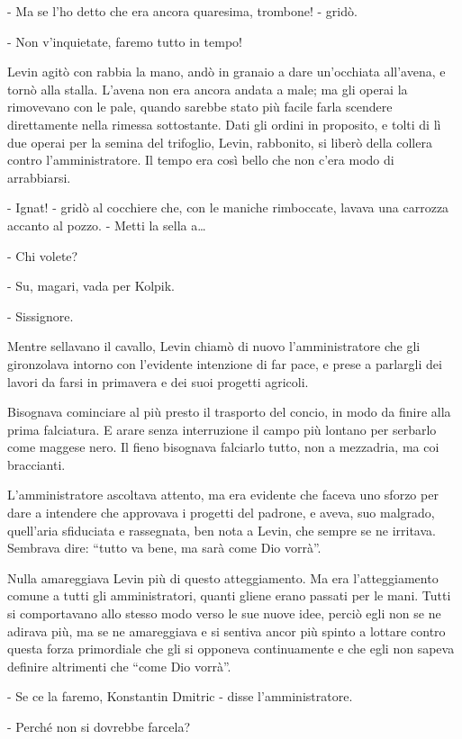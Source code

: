 - Ma se l'ho detto che era ancora quaresima, trombone! - gridò. 

- Non v'inquietate, faremo tutto in tempo! 

Levin agitò con rabbia la mano, andò in granaio a dare un'occhiata all'avena, e tornò alla stalla. L'avena non era ancora andata a male; ma gli operai la rimovevano con le pale, quando sarebbe stato più facile farla scendere direttamente nella rimessa sottostante. Dati gli ordini in proposito, e tolti di lì due operai per la semina del trifoglio, Levin, rabbonito, si liberò della collera contro l'amministratore. Il tempo era così bello che non c'era modo di arrabbiarsi. 

- Ignat! - gridò al cocchiere che, con le maniche rimboccate, lavava una carrozza accanto al pozzo. - Metti la sella a\ldots{} 

- Chi volete? 

- Su, magari, vada per Kolpik. 

- Sissignore. 

Mentre sellavano il cavallo, Levin chiamò di nuovo l'amministratore che gli gironzolava intorno con l'evidente intenzione di far pace, e prese a parlargli dei lavori da farsi in primavera e dei suoi progetti agricoli. 

Bisognava cominciare al più presto il trasporto del concio, in modo da finire alla prima falciatura. E arare senza interruzione il campo più lontano per serbarlo come maggese nero. Il fieno bisognava falciarlo tutto, non a mezzadria, ma coi braccianti. 

L'amministratore ascoltava attento, ma era evidente che faceva uno sforzo per dare a intendere che approvava i progetti del padrone, e aveva, suo malgrado, quell'aria sfiduciata e rassegnata, ben nota a Levin, che sempre se ne irritava. Sembrava dire: ``tutto va bene, ma sarà come Dio vorrà''. 

Nulla amareggiava Levin più di questo atteggiamento. Ma era l'atteggiamento comune a tutti gli amministratori, quanti gliene erano passati per le mani. Tutti si comportavano allo stesso modo verso le sue nuove idee, perciò egli non se ne adirava più, ma se ne amareggiava e si sentiva ancor più spinto a lottare contro questa forza primordiale che gli si opponeva continuamente e che egli non sapeva definire altrimenti che ``come Dio vorrà''. 

- Se ce la faremo, Konstantin Dmitric - disse l'amministratore. 

- Perché non si dovrebbe farcela? 

